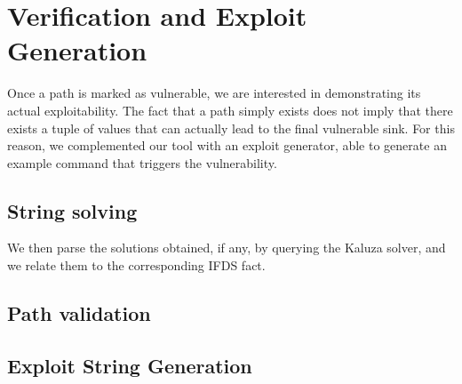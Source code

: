 \section{Verification and Exploit Generation}
\label{sec:verification}

Once a path is marked as vulnerable, we are interested in demonstrating its actual 
exploitability. The fact that a path simply exists does not imply that there exists a 
tuple of values that can actually lead to the final vulnerable sink. For this reason, 
we complemented our tool with an exploit generator, able to generate an example 
command that triggers the vulnerability.

\subsection{String solving}


We then parse the solutions obtained, if any, by querying the Kaluza solver, and we relate them to the corresponding IFDS fact.

\subsection{Path validation}

\subsection{Exploit String Generation}
